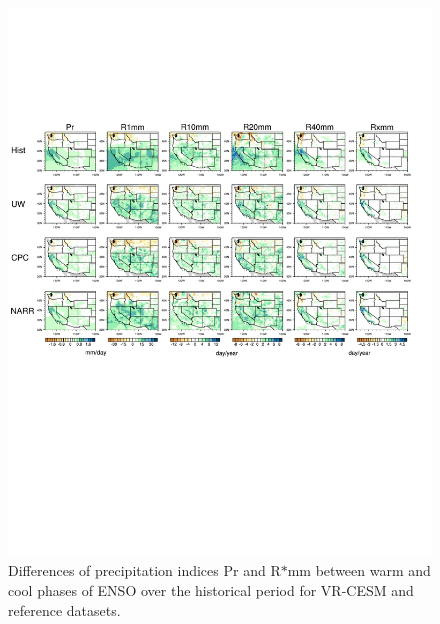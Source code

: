 \begin{figure}
\begin{center}
\includegraphics[width=6in]{supplement/wd_index_enso_ref_wetSeason.pdf}
\caption{Differences of precipitation indices Pr and R$\ast$mm between warm and cool phases of ENSO over the historical period for VR-CESM and reference datasets.}
\end{center}
\label{fig:S4}
\end{figure}

